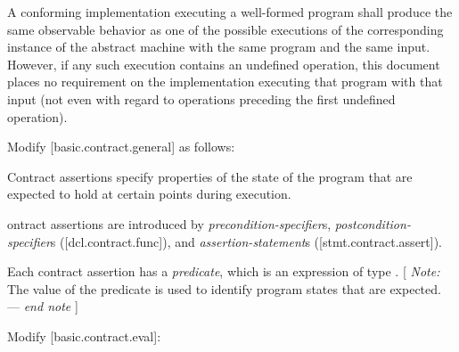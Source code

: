 \begin{adjustwidth}{0.5cm}{0.5cm}
A conforming implementation executing a well-formed program shall produce the same observable behavior as one of the possible executions of the corresponding instance of the abstract machine with the same program and the same input. However, if any such execution contains an undefined operation, this document places no requirement on the implementation executing that program with that input (not even with regard to operations preceding the first undefined operation). 


\end{adjustwidth}

Modify [basic.contract.general] as follows:
\begin{adjustwidth}{0.5cm}{0.5cm}
Contract assertions specify properties of the state of the program that are expected to hold at certain points during execution.

ontract assertions are introduced by \emph{precondition-specifier}s, \emph{postcondition-specifier}s ([dcl.contract.func]), and \emph{assertion-statement}s ([stmt.contract.assert]). 

Each contract assertion has a \emph{predicate}, which is an expression of type . [ \emph{Note:} The value of the predicate is used to identify program states that are expected. --- \emph{end note} ]
\end{adjustwidth}

Modify [basic.contract.eval]:


